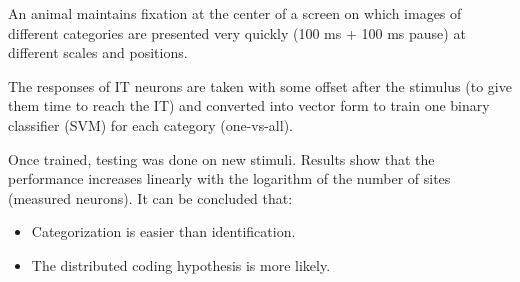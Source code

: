 \begin{casestudy}
    An animal maintains fixation at the center of a screen on which images of different categories are presented very quickly (100 ms + 100 ms pause)
    at different scales and positions.

    The responses of IT neurons are taken with some offset after the stimulus (to give them time to reach the IT)
    and converted into vector form to train one binary classifier (SVM) for each category (one-vs-all).

    Once trained, testing was done on new stimuli.
    Results show that the performance increases linearly with the logarithm of the number of sites (measured neurons).
    It can be concluded that:
    \begin{itemize}
        \item Categorization is easier than identification.
        \item The distributed coding hypothesis is more likely.
    \end{itemize}


\end{casestudy}
